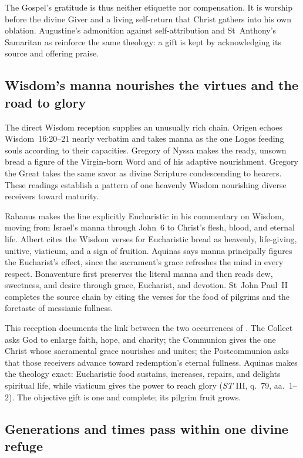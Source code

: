 The Gospel's gratitude is thus neither etiquette nor compensation. It is
worship before the divine Giver and a living self-return that Christ gathers
into his own oblation. Augustine's admonition against self-attribution and
St~Anthony's Samaritan as  reinforce the same theology: a gift is
kept by acknowledging its source and offering praise.

\subsection*{Wisdom's manna nourishes the virtues and the road to glory\enspace
  }

The direct Wisdom reception supplies an unusually rich chain. Origen echoes
Wisdom~16:20--21 nearly verbatim and takes manna as the one Logos feeding souls
according to their capacities. Gregory of Nyssa makes the ready, unsown bread
a figure of the Virgin-born Word and of his adaptive nourishment. Gregory the
Great takes the same savor as divine Scripture condescending to hearers. These
readings establish a pattern of one heavenly Wisdom nourishing diverse
receivers toward maturity.

Rabanus makes the line explicitly Eucharistic in his commentary on Wisdom,
moving from Israel's manna through John~6 to Christ's flesh, blood, and eternal
life. Albert cites the Wisdom verses for Eucharistic bread as heavenly,
life-giving, unitive, viaticum, and a sign of fruition. Aquinas says manna
principally figures the Eucharist's effect, since the sacrament's grace
refreshes the mind in every respect. Bonaventure first preserves the literal
manna and then reads dew, sweetness, and desire through grace, Eucharist, and
devotion. St~John Paul~II completes the source chain by citing the verses for
the food of pilgrims and the foretaste of messianic fullness.

This reception documents the link between the two occurrences of
. The Collect asks God to enlarge faith, hope, and charity;
the Communion gives the one Christ whose sacramental grace nourishes and
unites; the Postcommunion asks that those receivers advance toward redemption's
eternal fullness. Aquinas makes the theology exact: Eucharistic food sustains,
increases, repairs, and delights spiritual life, while viaticum gives the power
to reach glory (\emph{ST} III, q.~79, aa.~1--2). The objective gift is one and
complete; its pilgrim fruit grows.

\subsection*{Generations and times pass within one divine refuge\enspace
  }

